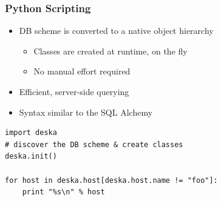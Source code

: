 \documentclass{beamer}
\begin{document}
{
\begin{frame}[plain]
\end{frame}
}

\begin{frame}[fragile]
\frametitle{Python Scripting}
\begin{itemize}
    \item DB scheme is converted to a native object hierarchy
        \begin{itemize}
            \item Classes are created at runtime, on the fly
            \item No manual effort required
        \end{itemize}
    \item Efficient, server-side querying
    \item Syntax similar to the SQL Alchemy
\end{itemize}
\begin{verbatim}
import deska
# discover the DB scheme & create classes
deska.init()

for host in deska.host[deska.host.name != "foo"]:
    print "%s\n" % host
\end{verbatim}
\end{frame}
\end{document}

